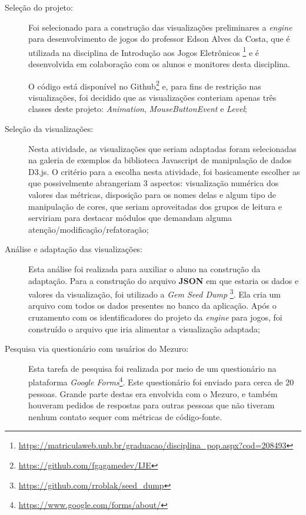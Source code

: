 \begin{description}
  \item [Seleção do projeto:]
    Foi selecionado para a construção das visualizações preliminares a
    \textit{engine} para desenvolvimento de jogos do professor Edson Alves da
    Costa, que é utilizada na disciplina de Introdução aos Jogos Eletrônicos
    \footnote{\url{https://matriculaweb.unb.br/graduacao/disciplina_pop.aspx?cod=208493}}
     e é desenvolvida em colaboração com os alunos e monitores desta disciplina.

     O código está disponível no Github\footnote{\url{https://github.com/fgagamedev/IJE}}
     e, para fins de restrição nas visualizações, foi decidido que as
     visualizações conteriam apenas três classes deste projeto: \textit{Animation},
     \textit{MouseButtonEvent} e \textit{Level};

  \item [Seleção da visualizações:]
    Nesta atividade, as visualizações que seriam adaptadas foram selecionadas na
    galeria de exemplos da biblioteca Javascript de manipulação de dados D3.js.
    O critério para a escolha nesta atividade, foi basicamente escolher as que
    possivelmente abrangeriam 3 aspectos: visualização numérica dos valores das
    métricas, disposição para os nomes delas e algum tipo de manipulação de
    cores, que seriam aproveitadas dos grupos de leitura e serviriam para
    destacar módulos que demandam alguma atenção/modificação/refatoração;

  \item [Análise e adaptação das visualizações:]
    Esta análise foi realizada para auxiliar o aluno na construção da adaptação.
    Para a construção do arquivo \textbf{JSON} em que estaria os dados e valores
    da visualização, foi utilizado a \textit{Gem Seed Dump}
    \footnote{\url{https://github.com/rroblak/seed_dump}}. Ela cria um arquivo
    com todos os dados presentes no banco da aplicação. Após o cruzamento com
    os identificadores do projeto da \textit{engine} para jogos, foi construído
    o arquivo que iria alimentar a visualização adaptada;

  \item [Pesquisa via questionário com usuários do Mezuro:]
    Esta tarefa de pesquisa foi realizada por meio de um questionário na
    plataforma \textit{Google Forms}\footnote{\url{https://www.google.com/forms/about/}}.
    Este questionário foi enviado para cerca de 20 pessoas. Grande parte destas
    era envolvida com o Mezuro, e também houveram pedidos de respostas para
    outras pessoas que não tiveram nenhum contato sequer com métricas de
    código-fonte.


\end{description}
